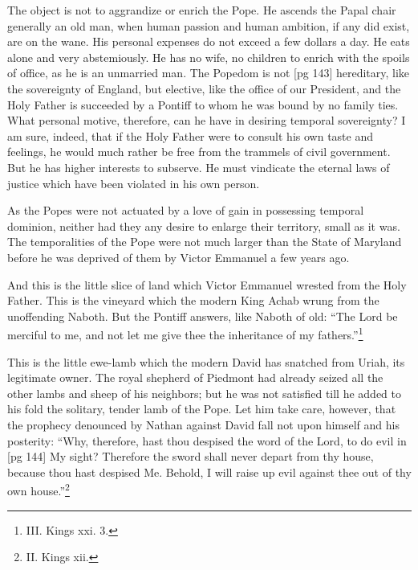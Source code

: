 The object is not to aggrandize or enrich the
Pope. He ascends the Papal chair generally an
old man, when human passion and human ambition,
if any did exist, are on the wane. His personal
expenses do not exceed a few dollars a day.
He eats alone and very abstemiously. He has no
wife, no children to enrich with the spoils of office,
as he is an unmarried man. The Popedom is not
[pg 143]
hereditary, like the sovereignty of England, but
elective, like the office of our President, and the
Holy Father is succeeded by a Pontiff to whom he
was bound by no family ties. What personal motive,
therefore, can he have in desiring temporal
sovereignty? I am sure, indeed, that if the Holy
Father were to consult his own taste and feelings,
he would much rather be free from the trammels
of civil government. But he has higher interests
to subserve. He must vindicate the eternal laws
of justice which have been violated in his own
person.

As the Popes were not actuated by a love of
gain in possessing temporal dominion, neither had
they any desire to enlarge their territory, small as
it was. The temporalities of the Pope were not
much larger than the State of Maryland before he
was deprived of them by Victor Emmanuel a few
years ago.

And this is the little slice of land which Victor
Emmanuel wrested from the Holy Father. This
is the vineyard which the modern King Achab
wrung from the unoffending Naboth. But the
Pontiff answers, like Naboth of old: “The Lord be
merciful to me, and not let me give thee the inheritance
of my fathers.”\footnote{III. Kings xxi. 3.}

This is the little ewe-lamb which the modern
David has snatched from Uriah, its legitimate
owner. The royal shepherd of Piedmont had already
seized all the other lambs and sheep of his
neighbors; but he was not satisfied till he added to
his fold the solitary, tender lamb of the Pope. Let
him take care, however, that the prophecy denounced
by Nathan against David fall not upon
himself and his posterity: “Why, therefore, hast
thou despised the word of the Lord, to do evil in
[pg 144]
My sight? Therefore the sword shall never depart
from thy house, because thou hast despised
Me. Behold, I will raise up evil against thee out
of thy own house.”\footnote{II. Kings xii.}

